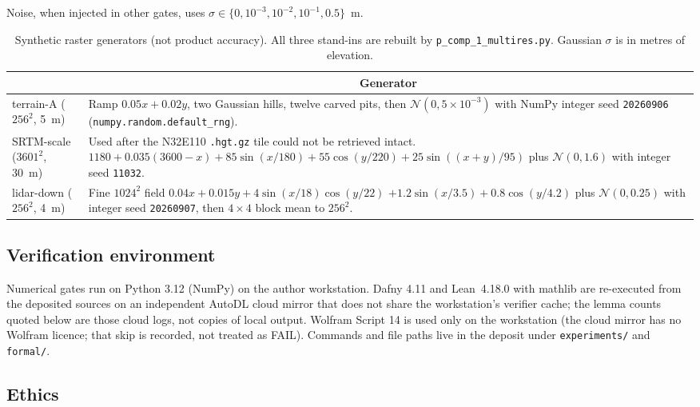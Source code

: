 \documentclass[11pt,a4paper]{article}
\newcommand{\thead}[1]{\multicolumn{1}{c}{#1}}
\begin{document}
Noise, when injected in other gates, uses
$\sigma\in\{0,10^{-3},10^{-2},10^{-1},0.5\}$~m.

\begin{table}[!htbp]
\centering
\caption{Synthetic raster generators (not product accuracy). All three
stand-ins are rebuilt by \texttt{p\_comp\_1\_multires.py}. Gaussian
$\sigma$ is in metres of elevation.}
\label{tab:synth}
\small
\begin{tabularx}{\textwidth}{>{\centering\arraybackslash}m{2.6cm}X}
\toprule
\thead{Stack} & \thead{Generator} \\
\midrule
terrain-A ($256^{2}$, 5~m) &
Ramp $0.05x+0.02y$, two Gaussian hills, twelve carved pits, then
$\mathcal{N}(0,5\times10^{-3})$ with NumPy integer seed
\texttt{20260906}
(\texttt{numpy.random.default\_rng}). \\
SRTM-scale ($3601^{2}$, 30~m) &
Used after the N32E110 \texttt{.hgt.gz} tile could not be retrieved intact.
$1180+0.035(3600-x)+85\sin(x/180)+55\cos(y/220)+25\sin((x+y)/95)$
plus $\mathcal{N}(0,1.6)$ with integer seed \texttt{11032}. \\
lidar-down ($256^{2}$, 4~m) &
Fine $1024^{2}$ field $0.04x+0.015y+4\sin(x/18)\cos(y/22)$
$+1.2\sin(x/3.5)+0.8\cos(y/4.2)$ plus $\mathcal{N}(0,0.25)$ with
integer seed \texttt{20260907}, then $4\times4$ block mean to $256^{2}$. \\
\bottomrule
\end{tabularx}
\end{table}

\subsection{Verification environment}

Numerical gates run on Python 3.12 (NumPy) on the author workstation.
Dafny 4.11 and Lean~4.18.0 with mathlib are re-executed from the
deposited sources on an independent AutoDL cloud mirror that does not
share the workstation's verifier cache; the lemma counts quoted below
are those cloud logs, not copies of local output. Wolfram Script 14 is
used only on the workstation (the cloud mirror has no Wolfram licence;
that skip is recorded, not treated as FAIL). Commands and file paths
live in the deposit under \texttt{experiments/} and \texttt{formal/}.

\subsection{Ethics}
\end{document}
